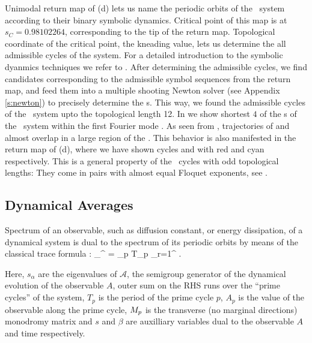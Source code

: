 Unimodal return map of  (d) lets us name the periodic orbits of the \twomode\ system according to their binary symbolic dynamics. Critical point of this map is at $s_C=0.98102264$, corresponding to the tip of the return map. Topological coordinate of the critical point, the kneading value, lets us determine the all admissible cycles of the system. For a detailed introduction to the symbolic dyanmics techniques we refer to . After determining the admissible cycles, we find candidates corresponding to the admissible symbol sequences from the return map, and feed them into a multiple shooting Newton solver (see Appendix \ref{s:newton}) to precisely determine the \rpo s. This way, we found the admissible cycles of the \twomode\ system upto the topological length 12. In  we show shortest $4$ of the \rpo s of the \twomode\ system within the first Fourier mode \slicePlane . As seen from , trajectories of  and  almost overlap in a large region of the \statesp . This behavior is also manifested in the return map of  (d), where we have shown cycles  and  with red and cyan respectively. This is a general property of the \twomode\ cycles with odd topological lengths: They come in pairs with almost equal Floquet exponents, see .

\subsection{Dynamical Averages}
Spectrum of an observable, such as diffusion constant, or energy dissipation, of a dynamical system is dual to the spectrum of its periodic orbits by means of the classical trace formula :
\beq
\sum_{}^{\infty}  = \sum_p T_p \sum_{r=1}^{\infty}  .

Here, $s_{\alpha}$ are the eigenvalues of $\mathcal{A}$, the semigroup generator of the dynamical evolution of the observable $A$, outer sum on the RHS runs over the ``prime cycles'' of the system, $T_p$ is the period of the prime cycle $p$, $A_p$ is the value of the observable along the prime cycle, $M_p$ is the transverse (no marginal directions) monodromy matrix and $s$ and $\beta$ are auxilliary variables dual to the observable $A$ and time respectively. 

